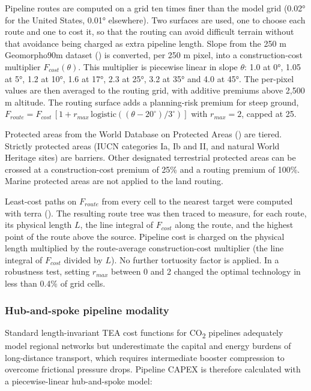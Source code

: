 \documentclass[
  letterpaper,
]{article}
\begin{document}
Pipeline routes are computed on a grid ten times finer than the model
grid (0.02° for the United States, 0.01° elsewhere). Two surfaces are
used, one to choose each route and one to cost it, so that the routing
can avoid difficult terrain without that avoidance being charged as
extra pipeline length. Slope from the 250 m Geomorpho90m dataset
() is converted, per 250 m pixel,
into a construction-cost multiplier \(F_{cost}(\theta)\). This
multiplier is piecewise linear in slope \(\theta\): 1.0 at 0°, 1.05 at
5°, 1.2 at 10°, 1.6 at 17°, 2.3 at 25°, 3.2 at 35° and 4.0 at 45°. The
per-pixel values are then averaged to the routing grid, with additive
premiums above 2,500 m altitude. The routing surface adds a
planning-risk premium for steep ground,
\(F_{route} = F_{cost}\,[1 + r_{max}\,\mathrm{logistic}((\theta - 20^\circ)/3^\circ)]\)
with \(r_{max} = 2\), capped at 25.

Protected areas from the World Database on Protected Areas
() are tiered. Strictly protected
areas (IUCN categories Ia, Ib and II, and natural World Heritage sites)
are barriers. Other designated terrestrial protected areas can be
crossed at a construction-cost premium of 25\% and a routing premium of
100\%. Marine protected areas are not applied to the land routing.

Least-cost paths on \(F_{route}\) from every cell to the nearest target
were computed with terra ().
The resulting route tree was then traced to measure, for each route, its
physical length \(L\), the line integral of \(F_{cost}\) along the
route, and the highest point of the route above the source. Pipeline
cost is charged on the physical length multiplied by the route-average
construction-cost multiplier (the line integral of \(F_{cost}\) divided
by \(L\)). No further tortuosity factor is applied. In a robustness
test, setting \(r_{max}\) between 0 and 2 changed the optimal technology
in less than 0.4\% of grid cells.

\subsubsection{Hub-and-spoke pipeline
modality}\label{hub-and-spoke-pipeline-modality}

Standard length-invariant TEA cost functions for CO\textsubscript{2}
pipelines adequately model regional networks but underestimate the
capital and energy burdens of long-distance transport, which requires
intermediate booster compression to overcome frictional pressure drops.
Pipeline CAPEX is therefore calculated with a piecewise-linear
hub-and-spoke model:
\end{document}
